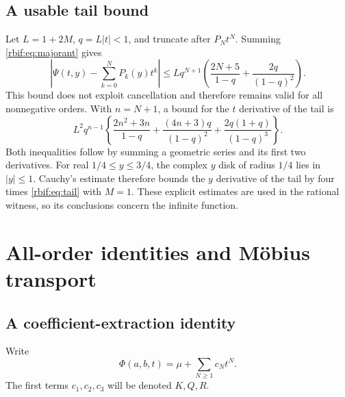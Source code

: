 \subsection{A usable tail bound}
Let $L=1+2M$, $q=L|t|<1$, and truncate after $P_Nt^N$. Summing
\eqref{rbif:eq:majorant} gives
\begin{equation}
 \left|\Psi(t,y)-\sum_{k=0}^NP_k(y)t^k\right|
 \le Lq^{N+1}\left(\frac{2N+5}{1-q}
                         +\frac{2q}{(1-q)^2}\right).
 \label{rbif:eq:tail}
\end{equation}
This bound does not exploit cancellation and therefore remains valid for
all nonnegative orders. With $n=N+1$, a bound for the $t$ derivative of
the tail is
\begin{equation}
 L^2q^{n-1}\left\{
 \frac{2n^2+3n}{1-q}+\frac{(4n+3)q}{(1-q)^2}
                  +\frac{2q(1+q)}{(1-q)^3}\right\}.
 \label{rbif:eq:tailt}
\end{equation}
Both inequalities follow by summing a geometric series and its first
two derivatives. For real $1/4\le y\le3/4$, the complex $y$ disk of
radius $1/4$ lies in $|y|\le1$. Cauchy's estimate therefore bounds the
$y$ derivative of the tail by four times \eqref{rbif:eq:tail} with $M=1$.
These explicit estimates are used in the rational witness, so its
conclusions concern the infinite function.

\section{All-order identities and M\"obius transport}
\label{rbif:sec:identities}
\subsection{A coefficient-extraction identity}
Write
\begin{equation}
 \Phi(a,b,t)=\mu+\sum_{N\ge1}c_Nt^N.
 \label{rbif:eq:cN}
\end{equation}
The first terms $c_1,c_2,c_3$ will be denoted $K,Q,R$.

